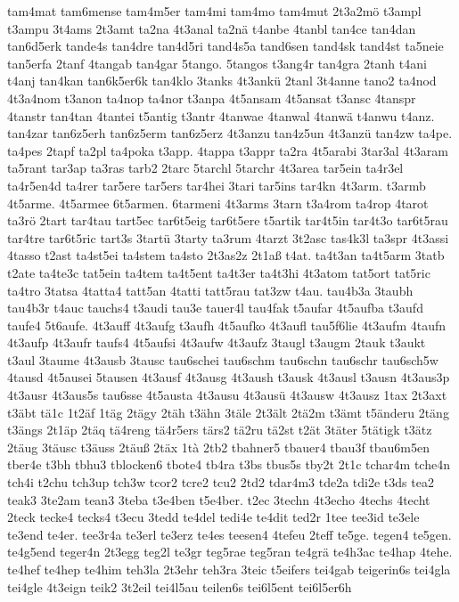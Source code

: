 {tam4mat
tam6mense
tam4m5er
tam4mi
tam4mo
tam4mut
2t3a2mö
t3ampl
t3ampu
3t4ams
2t3amt
ta2na
4t3anal
ta2nä
t4anbe
4tanbl
tan4ce
tan4dan
tan6d5erk
tande4s
tan4dre
tan4d5ri
tand4s5a
tand6sen
tand4sk
tand4st
ta5neie
tan5erfa
2tanf
4tangab
tan4gar
5tango.
5tangos
t3ang4r
tan4gra
2tanh
t4ani
t4anj
tan4kan
tan6k5er6k
tan4klo
3tanks
4t3ankü
2tanl
3t4anne
tano2
ta4nod
4t3a4nom
t3anon
ta4nop
ta4nor
t3anpa
4t5ansam
4t5ansat
t3ansc
4tanspr
4tanstr
tan4tan
4tantei
t5antig
t3antr
4tanwae
4tanwal
4tanwä
t4anwu
t4anz.
tan4zar
tan6z5erh
tan6z5erm
tan6z5erz
4t3anzu
tan4z5un
4t3anzü
tan4zw
ta4pe.
ta4pes
2tapf
ta2pl
ta4poka
t3app.
4tappa
t3appr
ta2ra
4t5arabi
3tar3al
4t3aram
ta5rant
tar3ap
ta3ras
tarb2
2tarc
5tarchl
5tarchr
4t3area
tar5ein
ta4r3el
ta4r5en4d
ta4rer
tar5ere
tar5ers
tar4hei
3tari
tar5ins
tar4kn
4t3arm.
t3armb
4t5arme.
4t5armee
6t5armen.
6tarmeni
4t3arms
3tarn
t3a4rom
ta4rop
4tarot
ta3rö
2tart
tar4tau
tart5ec
tar6t5eig
tar6t5ere
t5artik
tar4t5in
tar4t3o
tar6t5rau
tar4tre
tar6t5ric
tart3s
3tartü
3tarty
ta3rum
4tarzt
3t2asc
tas4k3l
ta3spr
4t3assi
4tasso
t2ast
ta4st5ei
ta4stem
ta4sto
2t3as2z
2t1aß
t4at.
ta4t3an
ta4t5arm
3tatb
t2ate
ta4te3c
tat5ein
ta4tem
ta4t5ent
ta4t3er
ta4t3hi
4t3atom
tat5ort
tat5ric
ta4tro
3tatsa
4tatta4
tatt5an
4tatti
tatt5rau
tat3zw
t4au.
tau4b3a
3taubh
tau4b3r
t4auc
tauchs4
t3audi
tau3e
tauer4l
tau4fak
t5aufar
4t5aufba
t3aufd
taufe4
5t6aufe.
4t3auff
4t3aufg
t3aufh
4t5aufko
4t3aufl
tau5f6lie
4t3aufm
4taufn
4t3aufp
4t3aufr
taufs4
4t5aufsi
4t3aufw
4t3aufz
3taugl
t3augm
2tauk
t3aukt
t3aul
3taume
4t3ausb
3tausc
tau6schei
tau6schm
tau6schn
tau6schr
tau6sch5w
4tausd
4t5ausei
5tausen
4t3ausf
4t3ausg
4t3aush
t3ausk
4t3ausl
t3ausn
4t3aus3p
4t3ausr
4t3aus5s
tau6sse
4t5austa
4t3ausu
4t3ausü
4t3ausw
4t3ausz
1tax
2t3axt
t3äbt
tä1c
1t2äf
1täg
2tägy
2täh
t3ähn
3täle
2t3ält
2tä2m
t3ämt
t5änderu
2täng
t3ängs
2t1äp
2täq
tä4reng
tä4r5ers
tärs2
tä2ru
tä2st
t2ät
3täter
5tätigk
t3ätz
2täug
3täusc
t3äuss
2täuß
2täx
1tà
2tb2
tbahner5
tbauer4
tbau3f
tbau6m5en
tber4e
t3bh
tbhu3
tblocken6
tbote4
tb4ra
t3bs
tbus5s
tby2t
2t1c
tchar4m
tche4n
tch4i
t2chu
tch3up
tch3w
tcor2
tcre2
tcu2
2td2
tdar4m3
tde2a
tdi2e
t3ds
tea2
teak3
3te2am
tean3
3teba
t3e4ben
t5e4ber.
t2ec
3techn
4t3echo
4techs
4techt
2teck
tecke4
tecks4
t3ecu
3tedd
te4del
tedi4e
te4dit
ted2r
1tee
tee3id
te3ele
te3end
te4er.
tee3r4a
te3erl
te3erz
te4es
teesen4
4tefeu
2teff
te5ge.
tegen4
te5gen.
te4g5end
teger4n
2t3egg
teg2l
te3gr
teg5rae
teg5ran
te4grä
te4h3ac
te4hap
4tehe.
te4hef
te4hep
te4him
teh3la
2t3ehr
teh3ra
3teic
t5eifers
tei4gab
teigerin6s
tei4gla
tei4gle
4t3eign
teik2
3t2eil
tei4l5au
teilen6s
tei6l5ent
tei6l5er6h
}
